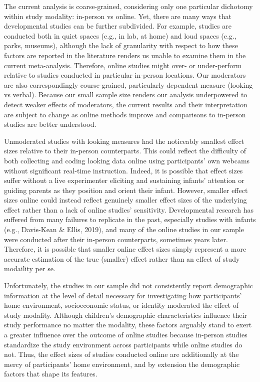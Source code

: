 \documentclass[
  man,floatsintext]{apa6}
\begin{document}
The current analysis is coarse-grained, considering only one particular dichotomy within study modality: in-person vs online. Yet, there are many ways that developmental studies can be further subdivided. For example, studies are conducted both in quiet spaces (e.g., in lab, at home) and loud spaces (e.g., parks, museums), although the lack of granularity with respect to how these factors are reported in the literature renders us unable to examine them in the current meta-analysis. Therefore, online studies might over- or under-perform relative to studies conducted in particular in-person locations. Our moderators are also correspondingly course-grained, particularly dependent measure (looking vs verbal). Because our small sample size renders our analysis underpowered to detect weaker effects of moderators, the current results and their interpretation are subject to change as online methods improve and comparisons to in-person studies are better understood.

Unmoderated studies with looking measures had the noticeably smallest effect sizes relative to their in-person counterparts. This could reflect the difficulty of both collecting and coding looking data online using participants' own webcams without significant real-time instruction. Indeed, it is possible that effect sizes suffer without a live experimenter eliciting and sustaining infants' attention or guiding parents as they position and orient their infant. However, smaller effect sizes online could instead reflect genuinely smaller effect sizes of the underlying effect rather than a lack of online studies' sensitivity. Developmental research has suffered from many failures to replicate in the past, especially studies with infants (e.g., Davis-Kean \& Ellis, 2019), and many of the online studies in our sample were conducted after their in-person counterparts, sometimes years later. Therefore, it is possible that smaller online effect sizes simply represent a more accurate estimation of the true (smaller) effect rather than an effect of study modaility per se.

Unfortunately, the studies in our sample did not consistently report demographic information at the level of detail necessary for investigating how participants' home environment, socioeconomic status, or identity moderated the effect of study modality. Although children's demographic characteristics influence their study performance no matter the modality, these factors arguably stand to exert a greater influence over the outcome of online studies because in-person studies standardize the study environment across participants while online studies do not. Thus, the effect sizes of studies conducted online are additionally at the mercy of participants' home environment, and by extension the demographic factors that shape its features.
\end{document}

